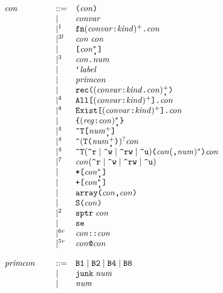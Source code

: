 \documentclass{article}
\newenvironment{gramrule}
  {\begin{flushleft}$\begin{array}{p{0.7in}ll}}
  {\end{array}$\end{flushleft}}
\newcommand{\nterm}[1]{{\it#1}}
\newcommand{\term}[1]{{\it#1}}
\newcommand{\ts}[1]{\hbox{\tt#1}}
\newcommand{\alt}{\mathrel{|}}
\begin{document}
\begin{gramrule}
\nterm{con} &::=& \ts{(} \nterm{con} \ts{)} \\
&|& \nterm{convar} \\
&|^1& \ts{fn} (\nterm{convar} \ts{:} \nterm{kind})^+ \ts{.} \nterm{con} \\
&|^{2l}& \nterm{con} \; \nterm{con} \\
&|& \ts{[} \nterm{con}^*_{\ts{,}} \ts{]} \\
&|^3& \nterm{con} \ts{.} \term{num} \\
&|& \ts{`} \nterm{label} \\
&|& \nterm{primcon} \\
&|& \ts{rec} \ts{(} (\nterm{convar} \ts{:} \nterm{kind} \ts{.}
    \nterm{con})^+_{\ts{,}} \ts{)} \\
&|^4& \ts{All} \ts{[} (\nterm{convar} \ts{:} \nterm{kind})^+ \ts{]} \ts{.} 
      \nterm{con} \\
&|^4& \ts{Exist} \ts{[} (\nterm{convar} \ts{:} \nterm{kind})^+ \ts{]} \ts{.} 
      \nterm{con} \\
&|& \verb+{+ (\nterm{reg} \ts{:} \nterm{con})^*_{\ts{,}} \verb+}+ \\
&|^4& \verb+^+ \ts{T} \ts{[} \nterm{num}^+_{\ts{,}} \ts{]} \\
&|^4& \verb+^+ ( \ts{T} \ts{(} \nterm{num}^+_{\ts{,}} \ts{)} )^? \nterm{con} \\
&|^4& \verb+^+ \ts{T} (\verb+^r+ \alt \verb+^w+ \alt \verb+^rw+ \alt
      \verb+^u+) \ts{(} \nterm{con} (\ts{,} \nterm{num})^* \ts{)}
      \nterm{con} \\
&|^7& \nterm{con} (\verb+^r+ \alt \verb+^w+ \alt \verb+^rw+ \alt \verb+^u+) \\
&|& \ts{*} \ts{[} \nterm{con}^*_{\ts{,}} \ts{]} \\
&|& \ts{+} \ts{[} \nterm{con}^*_{\ts{,}} \ts{]} \\
&|& \ts{array} \ts{(} \nterm{con} \ts{,} \nterm{con} \ts{)} \\
&|& \ts{S} \ts{(} \nterm{con} \ts{)} \\
&|^2& \ts{sptr} \; \nterm{con} \\
&|& \ts{se} \\
&|^{6r}& \nterm{con} \ts{::} \nterm{con} \\
&|^{5r}& \nterm{con} \ts{@} \nterm{con}
\end{gramrule}
\begin{gramrule}
\nterm{primcon} &::=& \ts{B1} \alt \ts{B2} \alt \ts{B4} \alt \ts{B8} \\
&|& \ts{junk} \; \term{num} \\
&|& \term{num}
\end{gramrule}
\end{document}
